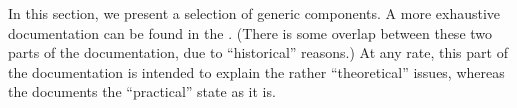 In this section, we present a selection of generic components.
A more exhaustive documentation can be found 
in the .
(There is some overlap between these two parts of the documentation,
due to ``historical'' reasons.)
At any rate, this part of the documentation is intended to
explain the rather ``theoretical'' issues,
whereas the 
documents the ``practical'' state as it is.